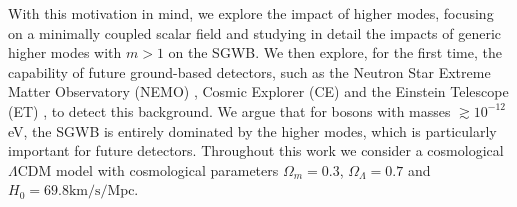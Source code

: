 \documentclass[
reprint,           %
superscriptaddress,%
amsmath,           %
amssymb,           %
aps,               %
prd,               %
notitlepage,       %
floatfix,          %
nofootinbib %
]{revtex4-1}
\begin{document}
With this motivation in mind, we explore the impact of higher modes, focusing on a minimally coupled scalar field and studying in detail the impacts of generic higher modes with $m>1$ on the SGWB. We then explore, for the first time, the capability of future ground-based detectors, such as the Neutron Star Extreme Matter Observatory (NEMO) \cite{Ackley:2020atn}, Cosmic Explorer (CE) \cite{Evans:2016mbw} and the Einstein Telescope (ET) \cite{Punturo:2010zz,Maggiore:2019uih}, to detect this background. We argue that for bosons with masses $\gtrsim 10^{-12}$ eV, the SGWB is entirely dominated by the higher modes, which is particularly important for future detectors. Throughout this work we consider a cosmological $\Lambda$CDM model with cosmological parameters $\Omega_{m}=0.3$, $\Omega_{\Lambda}=0.7$ and $H_0=69.8 \mathrm{km /s/Mpc}$.

\end{document}
